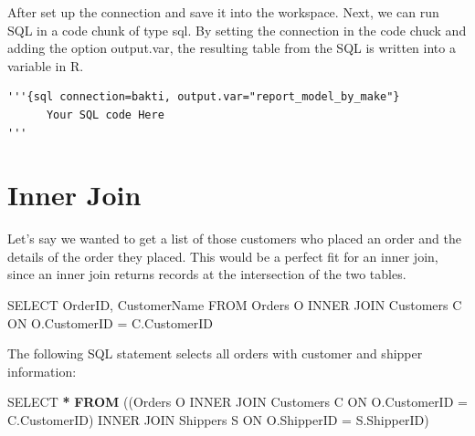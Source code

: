 \documentclass[
]{book}
\newenvironment{Shaded}{\begin{snugshade}}{\end{snugshade}}
\newcommand{\AttributeTok}[1]{\textcolor[rgb]{0.13,0.29,0.53}{#1}}
\newcommand{\FunctionTok}[1]{\textcolor[rgb]{0.13,0.29,0.53}{\textbf{#1}}}
\newcommand{\NormalTok}[1]{#1}
\newcommand{\OtherTok}[1]{\textcolor[rgb]{0.56,0.35,0.01}{#1}}
\newcommand{\SpecialCharTok}[1]{\textcolor[rgb]{0.81,0.36,0.00}{\textbf{#1}}}
\newcommand{\StringTok}[1]{\textcolor[rgb]{0.31,0.60,0.02}{#1}}
\begin{document}
After set up the connection and save it into the workspace. Next, we can run SQL in a code chunk of type sql. By setting the connection in the code chuck and adding the option output.var, the resulting table from the SQL is written into a variable in R.

\begin{verbatim}
'''{sql connection=bakti, output.var="report_model_by_make"} 
      Your SQL code Here
'''
\end{verbatim}

\hypertarget{inner-join}{%
\section{Inner Join}\label{inner-join}}

Let's say we wanted to get a list of those customers who placed an order and the details of the order they placed. This would be a perfect fit for an inner join, since an inner join returns records at the intersection of the two tables.

\begin{Shaded}
\begin{Highlighting}[]
\NormalTok{SELECT OrderID, CustomerName}
\NormalTok{  FROM Orders O}
\NormalTok{    INNER JOIN Customers C}
\NormalTok{      ON O.CustomerID }\OtherTok{=}\NormalTok{ C.CustomerID}
\end{Highlighting}
\end{Shaded}

\begin{Shaded}
\end{Shaded}

The following SQL statement selects all orders with customer and shipper information:

\begin{Shaded}
\begin{Highlighting}[]
\NormalTok{SELECT }\SpecialCharTok{*} 
  \FunctionTok{FROM}\NormalTok{ ((Orders O}
\NormalTok{    INNER JOIN Customers C}
\NormalTok{      ON }\AttributeTok{O.CustomerID =}\NormalTok{ C.CustomerID)}
\NormalTok{    INNER JOIN Shippers S }
\NormalTok{      ON }\AttributeTok{O.ShipperID =}\NormalTok{ S.ShipperID)}
\end{Highlighting}
\end{Shaded}
\end{document}
